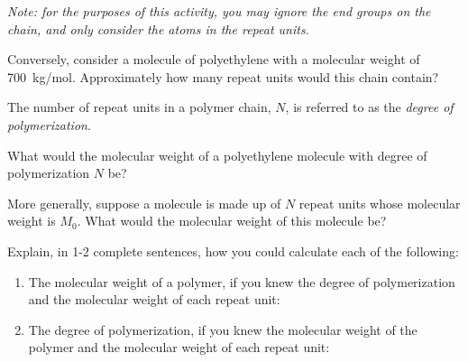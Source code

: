 \begin{activity}
\begin{ctqs}
				\emph{Note: for the purposes of this activity, you may ignore the  end groups on the chain, and only consider the atoms in the repeat units.}
	
		\begin{solution}[1.75in]
		\end{solution}
				
	\question Conversely, consider a molecule of polyethylene with a molecular weight of 700~kg/mol.  Approximately how many repeat units would this chain contain? \label{\labelbase:ctq:700kgPE}
	
		\begin{solution}[1.75in]
		\end{solution}
	
\end{ctqs}

\begin{infobox}

	The number of repeat units in a polymer chain, $N$, is referred to as the \emph{degree of polymerization}.

\end{infobox}

\begin{ctqs}
		
	\question What would the molecular weight of a polyethylene molecule with degree of polymerization $N$ be?
	
		\begin{solution}[1in]
		\end{solution}
		
	\question More generally, suppose a molecule is made up of $N$ repeat units whose molecular weight is $M_0$.  What would the molecular weight of this molecule be?
	
		\begin{solution}[1in]
		\end{solution}
	
	\question Explain, in 1-2 complete sentences, how you could calculate each of the following:
	
		\begin{enumerate}
			\item The molecular weight of a polymer, if you knew the degree of polymerization and the molecular weight of each repeat unit:
	
		\begin{solution}[1.75in]
		\end{solution}
			
			\item The degree of polymerization, if you knew the molecular weight of the polymer and the molecular weight of each repeat unit:
		\end{enumerate}
	

\end{ctqs}
\end{activity}
